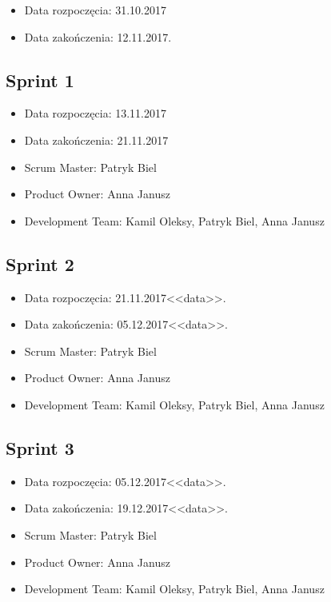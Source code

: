 \documentclass[a4paper]{article}
\begin{document}
\begin{itemize}
\item Data rozpoczęcia: 31.10.2017
\item  Data zakończenia: 12.11.2017.
\end{itemize}

\subsection{Sprint 1}

\begin{itemize}
\item Data rozpoczęcia:  13.11.2017
\item Data zakończenia: 21.11.2017
\item Scrum Master: Patryk Biel
\item Product Owner: Anna Janusz
\item Development Team: Kamil Oleksy, Patryk Biel, Anna Janusz
\end{itemize}

\subsection{Sprint 2}

\begin{itemize}
\item Data rozpoczęcia: 21.11.2017<<data>>.
\item  Data zakończenia: 05.12.2017<<data>>.
\item Scrum Master: Patryk Biel
\item Product Owner: Anna Janusz
\item Development Team: Kamil Oleksy, Patryk Biel, Anna Janusz
\end{itemize}

\subsection{Sprint 3}

\begin{itemize}
\item Data rozpoczęcia: 05.12.2017<<data>>.
\item  Data zakończenia: 19.12.2017<<data>>.
\item Scrum Master: Patryk Biel
\item Product Owner: Anna Janusz
\item Development Team: Kamil Oleksy, Patryk Biel, Anna Janusz
\end{itemize}
\end{document}
